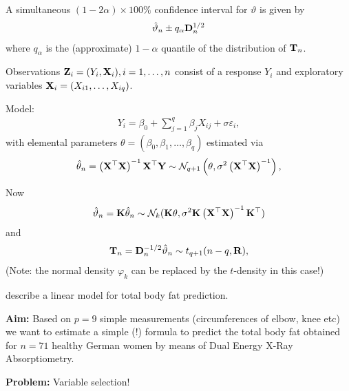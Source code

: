 \documentclass[landscape]{slides}
\begin{document}
A simultaneous $(1 - 2\alpha)
\times 100\%$ confidence interval for $\vartheta$ is given by 
\begin{eqnarray*}
\hat{\vartheta}_n \pm q_\alpha \mathbf{D}_n^{1/2}
\end{eqnarray*}
where $q_\alpha$ is the (approximate) $1 - \alpha$ quantile of the distribution of $\mathbf{T}_n$.


Observations $\mathbf{Z}_i = (Y_i, \mathbf{X}_i), i = 1, \dots, n$ consist of a response $Y_i$
and exploratory variables $\mathbf{X}_i = (X_{i1}, \dots, X_{iq})$.

Model:
\begin{eqnarray*}
Y_i = \beta_0 + \sum_{j = 1}^q \beta_j X_{ij} + \sigma \varepsilon_i,
\end{eqnarray*}
with elemental parameters $\theta = (\beta_0, \beta_1, \dots, \beta_q)$
estimated via
\begin{eqnarray*}
\hat{\theta}_n = \left(\X^\top\X\right)^{-1} \X^\top \Y \sim \N%
_{q+1}\left(\theta, \sigma^2 \left(\X^\top\X\right)^{-1}\right),
\end{eqnarray*}

Now
\begin{eqnarray*}
\hat{\vartheta}_n = \K \hat{\theta}_n \sim \N_k(\K \theta, \sigma^2 \K \left(\X^\top\X%
\right)^{-1} \K^\top)
\end{eqnarray*}
and
\begin{eqnarray*}
\mathbf{T}_n = \mathbf{D}_n^{-1/2} \hat{\vartheta}_n \sim t_{q+1}(n - q, \mathbf{R}),
\end{eqnarray*}
(Note: the normal density $\varphi_k$ can be replaced by the
$t$-density in this case!)


\cite{garcia2005} describe a linear model
for total body fat prediction.

\textbf{Aim:} Based on $p = 9$ simple measurements (circumferences of elbow, knee etc)
we want to estimate a simple (!) formula to predict the total body fat obtained for
$n = 71$ healthy German women by means of Dual Energy X-Ray Absorptiometry. 

\textbf{Problem:} Variable selection!

\end{document}
